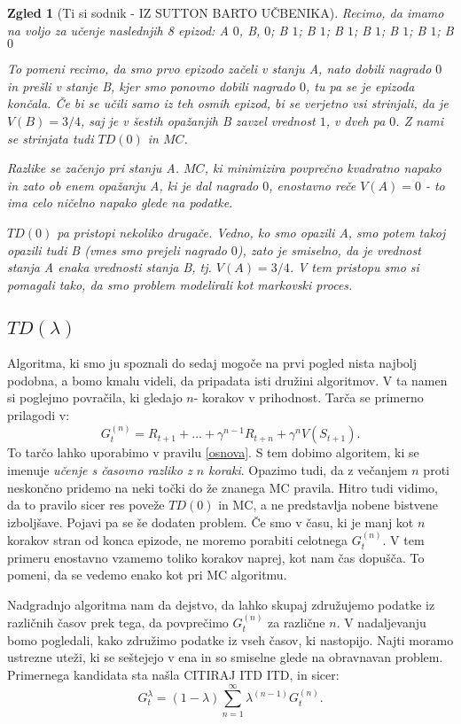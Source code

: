 \documentclass[12pt,a4paper]{amsart}
\theoremstyle{definition} %
\theoremstyle{plain} %
\newtheorem{zgled}[definicija]{Zgled}
\begin{document}
\begin{zgled}[Ti si sodnik - IZ SUTTON BARTO UČBENIKA]
    Recimo, da imamo na voljo za učenje naslednjih 8 epizod: 
    A $0$, B, $0$;
    B $1$;
    B $1$;
    B $1$;
    B $1$;
    B $1$;
    B $1$;
    B $0$

    To pomeni recimo, da smo prvo epizodo začeli v stanju A, nato dobili nagrado $0$ in prešli v 
    stanje B, kjer smo ponovno dobili nagrado $0$, tu pa se je epizoda končala. Če bi se učili 
    samo iz teh osmih epizod, bi se verjetno vsi strinjali, da je $V(B) = 3/4$, saj je v šestih
    opažanjih B zavzel vrednost $1$, v dveh pa $0$. Z nami se strinjata tudi $TD(0)$ in $MC$. 

    Razlike se začenjo pri stanju A. $MC$, ki minimizira povprečno kvadratno napako in zato ob 
    enem opažanju A, ki je dal nagrado $0$, enostavno reče $V(A) = 0$ - to ima celo ničelno 
    napako glede na podatke. 

    $TD(0)$ pa pristopi nekoliko drugače. Vedno, ko smo opazili A, smo potem takoj opazili tudi B
    (vmes smo prejeli nagrado $0$), zato je smiselno, da je vrednost stanja A enaka vrednosti 
    stanja B, tj. $V(A) = 3/4$. V tem pristopu smo si pomagali tako, da smo problem modelirali kot 
    markovski proces.
\end{zgled}

\subsection{$TD(\lambda)$}
Algoritma, ki smo ju spoznali do sedaj mogoče na prvi pogled nista najbolj podobna, a bomo kmalu 
videli, da pripadata isti družini algoritmov. V ta namen si poglejmo povračila, ki gledajo $n$-
korakov v prihodnost. Tarča se primerno prilagodi v: 
$$
G_t^{(n)} = R_{t+1} + \dots + \gamma^{n-1} R_{t+n} + \gamma^n V(S_{t+1}).
$$
To tarčo lahko uporabimo v pravilu \eqref{osnova}. S tem dobimo algoritem, ki se imenuje \textit{
učenje s časovno razliko z $n$ koraki}. Opazimo tudi, da z večanjem $n$ proti neskončno pridemo na 
neki točki do že znanega MC pravila. Hitro tudi vidimo, da to pravilo sicer res poveže $TD(0)$ in 
MC, a ne predstavlja nobene bistvene izboljšave. Pojavi pa se še dodaten problem. Če smo v času, ki
je manj kot $n$ korakov stran od konca epizode, ne moremo porabiti celotnega $G_t^{(n)}$. V tem 
primeru enostavno vzamemo toliko korakov naprej, kot nam čas dopušča. To pomeni, da se vedemo enako 
kot pri MC algoritmu.

Nadgradnjo algoritma nam da dejstvo, da lahko skupaj združujemo podatke iz različnih časov prek 
tega, da povprečimo $G_t^{(n)}$ za različne $n$. V nadaljevanju bomo pogledali, kako združimo 
podatke iz vseh časov, ki nastopijo. Najti moramo ustrezne uteži, ki se seštejejo v ena in so 
smiselne glede na obravnavan problem. Primernega kandidata sta našla CITIRAJ ITD ITD, in sicer:
$$
G_t^\lambda = (1 - \lambda) \sum_{n=1}^\infty \lambda^{(n-1)} G_t^{(n)}.
$$
\end{document}
